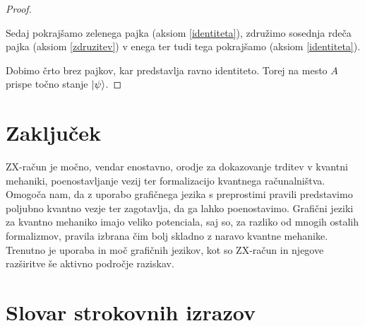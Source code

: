 \documentclass[mat1]{fmfdelo}
\begin{document}
\begin{proof}
\begin{center}
    \end{center}
    Sedaj pokrajšamo zelenega pajka (aksiom \ref{identiteta}), združimo sosednja rdeča pajka (aksiom \ref{zdruzitev}) v enega ter tudi tega pokrajšamo (aksiom \ref{identiteta}).
    \begin{center}
    \end{center}
    Dobimo črto brez pajkov, kar predstavlja ravno identiteto. Torej na mesto \(A\) prispe točno stanje \(\ket\psi\).
\end{proof}
\section{Zaključek}
ZX-račun je močno, vendar enostavno, orodje za dokazovanje trditev v kvantni mehaniki, poenostavljanje vezij ter formalizacijo kvantnega računalništva. Omogoča nam, da z uporabo grafičnega jezika s preprostimi pravili predstavimo poljubno kvantno vezje ter zagotavlja, da ga lahko poenostavimo. Grafični jeziki za kvantno mehaniko imajo veliko potenciala, saj so, za razliko od mnogih ostalih formalizmov, pravila izbrana čim bolj skladno z naravo kvantne mehanike. Trenutno je uporaba in moč grafičnih jezikov, kot so ZX-račun in njegove razširitve še aktivno področje raziskav. 

\section*{Slovar strokovnih izrazov}




\end{document}
